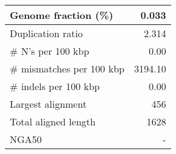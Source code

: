 \documentclass[12pt,a4paper]{article}
\begin{document}
\begin{table}[ht]
\begin{center}
\begin{tabular}{|l*{1}{|r}|}
Genome fraction (\%) & 0.033 \\ \hline
Duplication ratio & 2.314 \\ \hline
\# N's per 100 kbp & 0.00 \\ \hline
\# mismatches per 100 kbp & 3194.10 \\ \hline
\# indels per 100 kbp & 0.00 \\ \hline
Largest alignment & 456 \\ \hline
Total aligned length & 1628 \\ \hline
NGA50 & - \\ \hline
\end{tabular}
\end{center}
\end{table}
\end{document}
